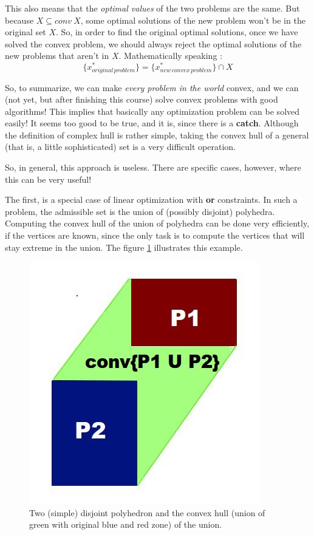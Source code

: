 This also means that the \textit{optimal values} of the two problems are the same. But because $X \subseteq conv \: X$, some optimal solutions of the new problem won't be in the original set $X$. So, in order to find the original optimal solutions, once we have solved the convex problem, we should always reject the optimal solutions of the new problems that aren't in $X$. Mathematically speaking : 
$$\{x^*_{original\,problem}\} = \{x^*_{new\,convex\,problem}\} \cap X $$

So, to summarize, we can make \textit{every problem in the world} convex, and we can (not yet, but after finishing this course) solve convex problems with good algorithms! This implies that basically any optimization problem can be solved easily! It seems too good to be true, and it is, since there is a \textbf{catch}\label{catch}. Although the definition of complex hull is rather simple, taking the convex hull of a general (that is, a little sophisticated) set is a very difficult operation.

So, in general, this approach is useless. There are specific cases, however, where this can be very useful!

The first, is a special case of linear optimization with \textbf{or} constraints. In such a problem, the admissible set is the union of (possibly disjoint) polyhedra. Computing the convex hull of the union of polyhedra can be done very efficiently, if the vertices are known, since the only task is to compute the vertices that will stay extreme in the union. The figure \ref{fig:my_label} illustrates this example.

\begin{figure}[H]
\centering
\includegraphics[scale=.4]{./images/Course2_polynoms}
\caption{Two (simple) disjoint polyhedron and the convex hull (union of green with original blue and red zone) of the union.}
\label{fig:my_label}
\end{figure}

